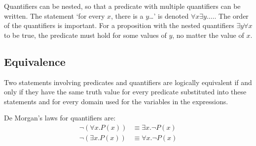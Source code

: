 Quantifiers can be nested, so that a predicate with multiple quantifiers can be written. The statement `for every \(x\), there is a \(y\)\dots' is denoted \(\forall x \exists y. \dots\). The order of the quantifiers is important. For a proposition with the nested quantifiers \(\exists y \forall x\) to be true, the predicate must hold for some values of \(y\), no matter the value of \(x\).

\subsection{Equivalence}
Two statements involving predicates and quantifiers are logically equivalent if and only if they have the same truth value for every predicate substituted into these statements and for every domain used for the variables in the expressions.

De Morgan's laws for quantifiers are:
\begin{align*}
    \neg(\forall x. P(x)) & \equiv \exists x. \neg P(x) \\
    \neg(\exists x. P(x)) & \equiv \forall x. \neg P(x)
\end{align*}
